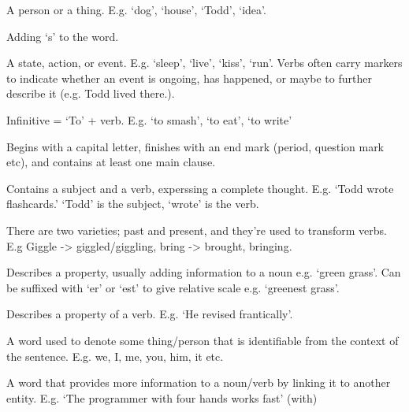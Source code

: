  {
	A person or a thing. E.g. `dog', `house', `Todd', `idea'.
}

 {
	Adding `s' to the word.
}

 {
	A state, action, or event. E.g. `sleep', `live', `kiss', `run'.
	\vspace{1em}
	Verbs often carry markers to indicate whether an event is ongoing, has happened, or
	maybe to further describe it (e.g. Todd lived there.).
}



 {
	Infinitive = `To' + verb.
	\vspace{1em}
	E.g. `to smash', `to eat', `to write'
}

 {
	Begins with a capital letter, finishes with an end mark (period, question mark etc), and contains at
	least one main clause.
}

 {
	Contains a subject and a verb, experssing a complete thought. E.g. `Todd wrote flashcards.'
	\vspace{1em}
	`Todd' is the subject, `wrote' is the verb.
}

 {
	There are two varieties; past and present, and they're used to transform verbs.
	\vspace{1em}
	E.g Giggle -> giggled/giggling, bring -> brought, bringing.
}


 {
	Describes a property, usually adding information to a noun e.g. `green grass'.
	\vspace{1em}
	Can be suffixed with `er' or `est' to give relative scale e.g. `greenest grass'.
}

 {
	Describes a property of a verb. E.g. `He revised frantically'.
}

 {
	A word used to denote some thing/person that is identifiable from the context of the sentence.
	\vspace{1em}
	E.g. we, I, me, you, him, it etc.
}

 {
	A word that provides more information to a noun/verb by linking it to another entity.
	\vspace{1em}
	E.g. `The programmer with four hands works fast' (with)
}

